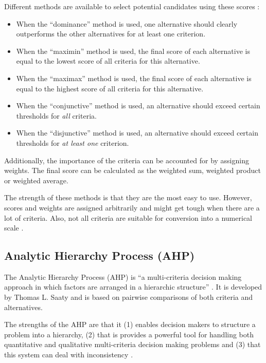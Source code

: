 Different methods are available to select potential candidates using these scores \cite{Kahraman:2008}:

\begin{itemize}
    \item When the ``dominance'' method is used, one alternative should clearly outperforms the other alternatives for at least one criterion. 
    \item When the ``maximin'' method is used, the final score of each alternative is equal to the lowest score of all criteria for this alternative.
    \item When the ``maximax'' method is used, the final score of each alternative is equal to the highest score of all criteria for this alternative.
    \item When the ``conjunctive'' method is used, an alternative should exceed certain thresholds for \emph{all} criteria.
    \item When the ``disjunctive'' method is used, an alternative should exceed certain thresholds for \emph{at least one} criterion. 
\end{itemize}

Additionally, the importance of the criteria can be accounted for by assigning weights. The final score can be calculated as the weighted sum, weighted product or weighted average.

The strength of these methods is that they are the most easy to use. However,  scores and weights are assigned arbitrarily and might get tough when there are a lot of criteria. Also, not all criteria are suitable for conversion into a numerical scale \cite{Jadhav:2009}.

\subsection{Analytic Hierarchy Process (AHP)}
\label{sec:ahp}

The Analytic Hierarchy Process (AHP) is ``a multi-criteria decision making approach in which factors are arranged in a hierarchic structure'' \cite{Saaty:1990}. It is developed by Thomas L. Saaty and is based on pairwise comparisons of both criteria and alternatives. 

The strengths of the AHP are that it (1) enables decision makers to structure a problem into a hierarchy, (2) that is provides a powerful tool for handling both quantitative and qualitative multi-criteria decision making problems and (3) that this system can deal with inconsistency \cite{Jadhav:2009}. 

